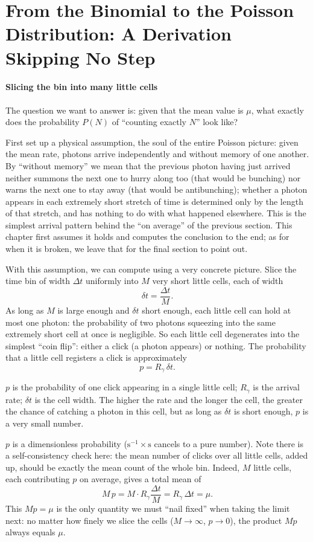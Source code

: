 \section{From the Binomial to the Poisson Distribution: A Derivation Skipping No Step}
\label{sec:e03-poisson}

\paragraph{Slicing the bin into many little cells}

The question we want to answer is: given that the mean value is $\mu$, what exactly does the probability $P(N)$ of ``counting exactly $N$'' look like?

First set up a physical assumption, the soul of the entire Poisson picture: given the mean rate, photons arrive independently and without memory of one another. By ``without memory'' we mean that the previous photon having just arrived neither summons the next one to hurry along too (that would be bunching) nor warns the next one to stay away (that would be antibunching); whether a photon appears in each extremely short stretch of time is determined only by the length of that stretch, and has nothing to do with what happened elsewhere. This is the simplest arrival pattern behind the ``on average'' of the previous section. This chapter first assumes it holds and computes the conclusion to the end; as for when it is broken, we leave that for the final section to point out.

With this assumption, we can compute using a very concrete picture. Slice the time bin of width $\Delta t$ uniformly into $M$ very short little cells, each of width
\[
  \delta t=\frac{\Delta t}{M}.
\]
As long as $M$ is large enough and $\delta t$ short enough, each little cell can hold at most one photon: the probability of two photons squeezing into the same extremely short cell at once is negligible. So each little cell degenerates into the simplest ``coin flip'': either a click (a photon appears) or nothing. The probability that a little cell registers a click is approximately
\begin{equation}
  p=R_\gamma\,\delta t .
  \label{eq:e03-cell-prob}
\end{equation}
\begin{formulaexplain}
$p$ is the probability of one click appearing in a single little cell; $R_\gamma$ is the arrival rate; $\delta t$ is the cell width. The higher the rate and the longer the cell, the greater the chance of catching a photon in this cell, but as long as $\delta t$ is short enough, $p$ is a very small number.
\end{formulaexplain}
$p$ is a dimensionless probability ($\mathrm{s^{-1}}\times\mathrm{s}$ cancels to a pure number). Note there is a self-consistency check here: the mean number of clicks over all little cells, added up, should be exactly the mean count of the whole bin. Indeed, $M$ little cells, each contributing $p$ on average, gives a total mean of
\[
  M\,p=M\cdot R_\gamma\frac{\Delta t}{M}=R_\gamma\,\Delta t=\mu .
\]
This $Mp=\mu$ is the only quantity we must ``nail fixed'' when taking the limit next: no matter how finely we slice the cells ($M\to\infty$, $p\to0$), the product $Mp$ always equals $\mu$.

